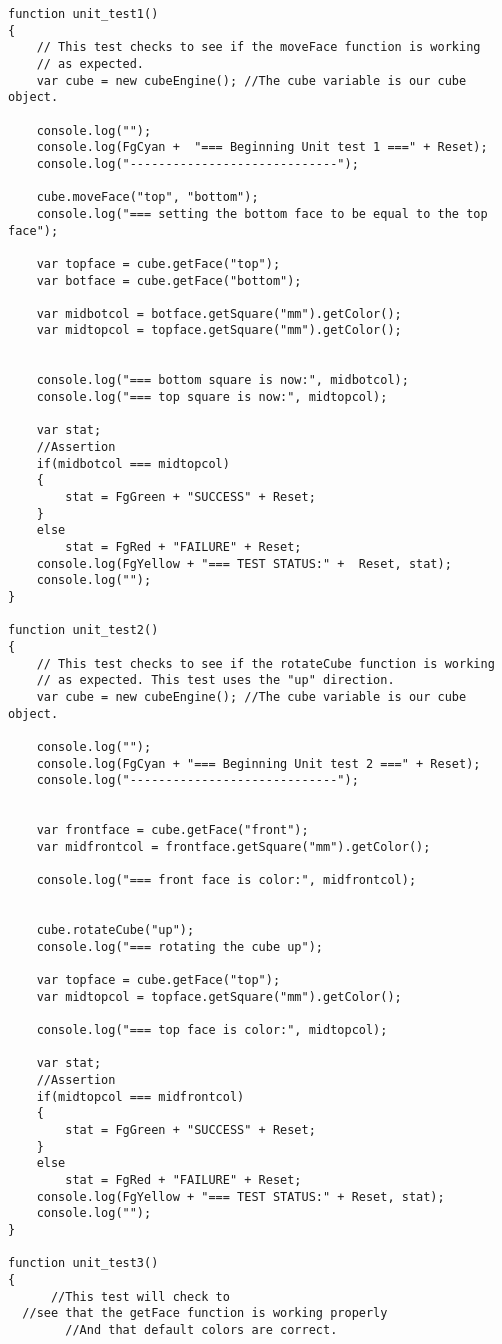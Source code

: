 \documentclass[12pt]{article}
\begin{document}
\begin{enumerate}
\begin{verbatim}
function unit_test1()
{
	// This test checks to see if the moveFace function is working
	// as expected.
	var cube = new cubeEngine(); //The cube variable is our cube object.

	console.log("");	
	console.log(FgCyan +  "=== Beginning Unit test 1 ===" + Reset);
	console.log("-----------------------------");

	cube.moveFace("top", "bottom");
	console.log("=== setting the bottom face to be equal to the top face");

	var topface = cube.getFace("top");
	var botface = cube.getFace("bottom");

	var midbotcol = botface.getSquare("mm").getColor();
	var midtopcol = topface.getSquare("mm").getColor();


	console.log("=== bottom square is now:", midbotcol);
	console.log("=== top square is now:", midtopcol);

	var stat;
	//Assertion
	if(midbotcol === midtopcol)
	{
		stat = FgGreen + "SUCCESS" + Reset;
	}
	else
		stat = FgRed + "FAILURE" + Reset;
	console.log(FgYellow + "=== TEST STATUS:" +  Reset, stat);
	console.log("");
}

function unit_test2()
{
	// This test checks to see if the rotateCube function is working
	// as expected. This test uses the "up" direction.
	var cube = new cubeEngine(); //The cube variable is our cube object.
	
	console.log("");	
	console.log(FgCyan + "=== Beginning Unit test 2 ===" + Reset);
	console.log("-----------------------------");


	var frontface = cube.getFace("front");
	var midfrontcol = frontface.getSquare("mm").getColor();

	console.log("=== front face is color:", midfrontcol);
	

	cube.rotateCube("up");
	console.log("=== rotating the cube up");
	
	var topface = cube.getFace("top");
	var midtopcol = topface.getSquare("mm").getColor();
	
	console.log("=== top face is color:", midtopcol);

	var stat;
	//Assertion
	if(midtopcol === midfrontcol)
	{
		stat = FgGreen + "SUCCESS" + Reset;
	}
	else
		stat = FgRed + "FAILURE" + Reset;
	console.log(FgYellow + "=== TEST STATUS:" + Reset, stat);
	console.log("");
}

function unit_test3()
{
	  //This test will check to 
  //see that the getFace function is working properly
        //And that default colors are correct.
  

\end{verbatim}
\end{enumerate}
\end{document}
